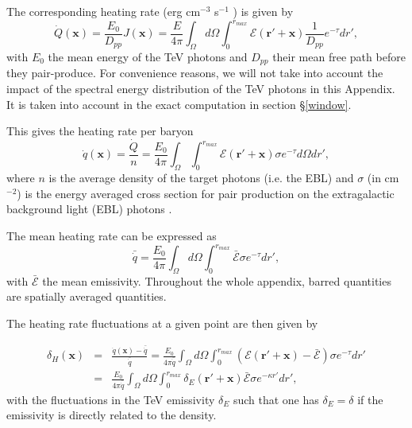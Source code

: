 \documentclass[twocolumns]{emulateapj}
\begin{document}
The corresponding heating rate (erg cm$^{-3}$ s$^{-1}$ ) is given by 
\begin{equation}
  \label{eq:heating_rate0}
  \dot{Q}(\mathbf{x})=\frac{E_0}{D_{pp}}J(\mathbf{x}) =\frac{E}{4\pi}   \int_{\Omega}d\Omega\int_0^{r_{max}}   \mathcal{E}(\mathbf{r}'+\mathbf{x}) \frac{1}{D_{pp}}  e^{-\tau} dr' ,
\end{equation}
with $E_0$ the mean energy of the TeV photons and $D_{pp}$ their mean free path  before they pair-produce. For convenience reasons,  we will not take into account the impact of the spectral energy distribution of the TeV photons in this Appendix. It is taken into account in the exact computation in section \S\ref{window}.

This gives the  heating rate per baryon
\begin{equation}
  \label{eq:heating_rate0}
  \dot{q}(\mathbf{x})=\frac{\dot{Q}}{n}= \frac{E_0}{4\pi}  \int_{\Omega}\int_0^{r_{max}}   \mathcal{E}(\mathbf{r}'+\mathbf{x})\sigma  e^{-\tau}d\Omega dr' ,
\end{equation}
where $n$ is the average density of the target photons (i.e. the EBL) and $\sigma$ (in cm$^{-2}$) is the energy averaged cross section for pair production on the extragalactic background light (EBL) photons \citep{1967PhRv..155.1408G}. 


The mean heating rate can be expressed as
\begin{equation}
  \label{eq:heating_rate0}
  \bar{\dot{q}}=\frac{E_0}{4\pi} \int_{\Omega}d\Omega\int_0^{r_{max}}  \bar{\mathcal{E}}\sigma  e^{-\tau}dr', 
\end{equation}
with $\bar{\mathcal{E}}$ the mean emissivity. Throughout the whole appendix, barred quantities are spatially averaged quantities.

The heating rate fluctuations at a given point are then given by 

\begin{eqnarray}
  \label{eq:heat_fluc_newt0}
  \delta_H(\mathbf{x})&=&\frac{\dot{q}(\mathbf{x})-\bar{\dot{q}}}{\bar{\dot{q}}}=\frac{E_0}{4\pi\bar{\dot{q}}} \int_{\Omega}d\Omega\int_0^{r_{max}}   (\mathcal{E}(\mathbf{r}'+\mathbf{x})-\bar{\mathcal{E}}) \sigma  e^{-\tau} dr' \\ \nonumber
  &=&\frac{E_0}{4\pi\bar{\dot{q}}}\int_{\Omega}d\Omega\int_0^{r_{max}}   \delta_E(\mathbf{r}'+\mathbf{x})\bar{\mathcal{E}}\sigma  e^{-\kappa r'}dr',
\end{eqnarray}
with the fluctuations in the TeV emissivity $\delta_E$ such that one has $\delta_E=\delta$ if the emissivity is directly related to the density.
\end{document}
